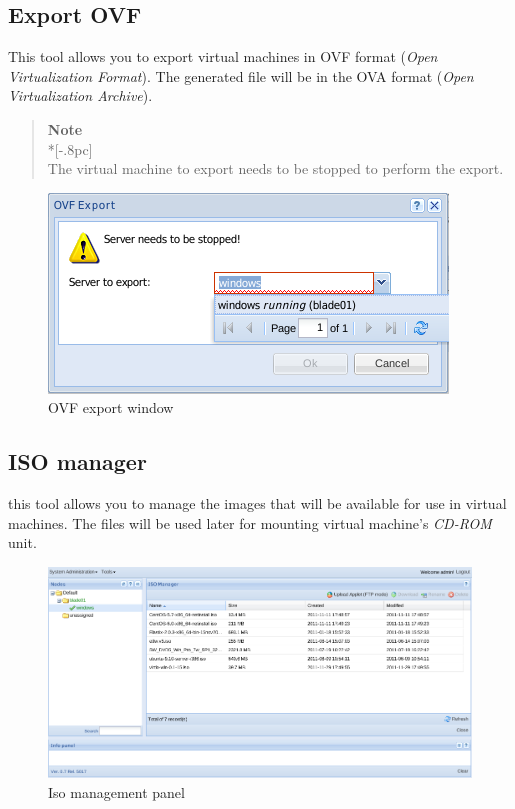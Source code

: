 \subsection{Export OVF}
This tool allows you to export virtual machines in OVF format (\emph{Open Virtualization Format}).
The generated file will be in the OVA format (\emph{Open Virtualization Archive}).

\begin{quote}
	{\large \bf Note} \\*[-.8pc]
	\underline{\hspace{6in}} \\
    The virtual machine to export needs to be stopped to perform the export.
\end{quote}

\begin{figure}[H]
	\begin{center}
	\includegraphics[scale=0.5]{screenshots/ovf_export.png}
	\caption{OVF export window}
	\label{fig:ovf_export}
	\end{center}
\end{figure}


\subsection{ISO manager}
\label{sec:iso_manager}
this tool allows you to manage the images that will be available for use in virtual machines.
The files will be used later for mounting virtual machine's \emph{CD-ROM} unit.

\begin{figure}[H]
	\begin{center}
	\includegraphics[scale=0.5]{screenshots/iso_manager.png}
	\caption{Iso management panel}
	\label{fig:iso_manager}
	\end{center}
\end{figure}

